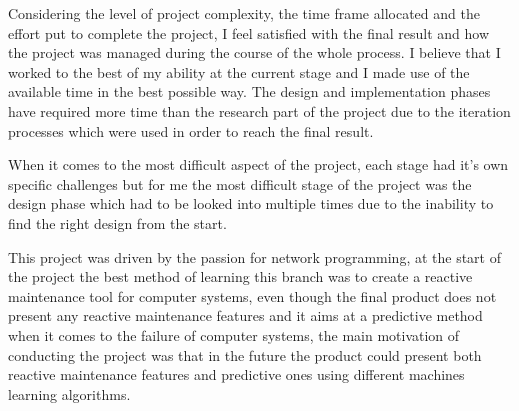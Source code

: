 Considering the level of project complexity, the time frame allocated and the effort put
to complete the project, I feel satisfied with the final result and how the project was
managed during the course of the whole process. I believe that I worked to the best of my
ability at the current stage and I made use of the available time in the best possible
way. The design and implementation phases have required more time than the research part
of the project due to the iteration processes which were used in order to reach the final
result. \par
When it comes to the most difficult aspect of the project, each stage had it's own specific
challenges but for me the most difficult stage of the project was the design phase which
had to be looked into multiple times due to the inability to find the right design from the
start. \par
This project was driven by the passion for network programming, at the start of the project
the best method of learning this branch was to create a reactive maintenance tool for
computer systems, even though the final product does not present any reactive maintenance
features and it aims at a predictive method when it comes to the failure of computer
systems, the main motivation of conducting the project was that in the future the product
could present both reactive maintenance features and predictive ones using different machines learning
algorithms.